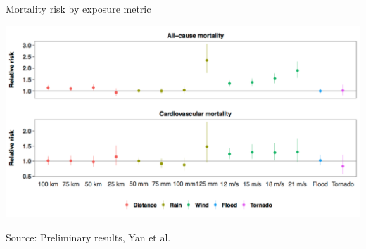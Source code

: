 \documentclass[ignorenonframetext,]{beamer}
\begin{document}
\begin{frame}{Mortality risk by exposure metric}

\begin{center}\includegraphics[width=\textwidth]{figures/rrs_by_metric} \end{center}

\footnotesize Source: Preliminary results, Yan et al.

\end{frame}
\end{document}
